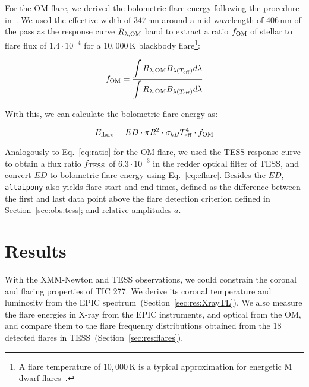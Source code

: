 \documentclass[twocolumn]{aastex631}
\begin{document}
For the OM flare, we derived the bolometric flare energy following the procedure in~\citet{shibayama2013superflares}. We used the effective width of $347\,$nm around a mid-wavelength of $406\,$nm of the pass as the response curve $R_{\lambda, \rm OM}$ band to extract a ratio $f_{\rm OM}$ of stellar to flare flux of $1.4\cdot 10^{-4}$ for a $10,000\,$K blackbody flare\footnote{A flare temperature of $10,000\,$K is a typical approximation for energetic M dwarf flares~\citep{kowalski2013timeresolved, howard2020evryflarea}.}:

\begin{equation}
    f_{\rm OM} = \frac{\displaystyle\int R_{\lambda, \rm OM} B_{\lambda(T_{\rm eff})}  d\lambda}{\displaystyle\int R_{\lambda, \rm OM} B_{\lambda(T_{\rm eff})} d\lambda} 
    \label{eq:ratio}
\end{equation}

With this, we can calculate the bolometric flare energy as:

\begin{equation}
    E_{\rm flare} = ED \cdot \pi R^2 \cdot \sigma_{kB} T_{\rm eff}^4 \cdot f_{\rm OM}
    \label{eq:eflare}
\end{equation}


Analogously to Eq.~\ref{eq:ratio} for the OM flare, we used the TESS response curve to obtain a flux ratio $f_{\rm TESS}$ of $6.3\cdot10^{-3}$ in the redder optical filter of TESS, and convert $ED$ to bolometric flare energy using Eq.~\ref{eq:eflare}. Besides the $ED$, \texttt{altaipony} also yields flare start and end times, defined as the difference between the first and last data point above the flare detection criterion defined in Section~\ref{sec:obs:tess}; and relative amplitudes $a$.

\section{Results}

With the XMM-Newton and TESS observations, we could constrain the coronal and flaring properties of TIC 277. We derive its coronal temperature and luminosity from the EPIC spectrum~(Section~\ref{sec:res:XrayTL}). We also measure the flare energies in X-ray from the EPIC instruments, and optical from the OM, and compare them to the flare frequency distributions obtained from the 18 detected flares in TESS~(Section~\ref{sec:res:flares}).
\end{document}
